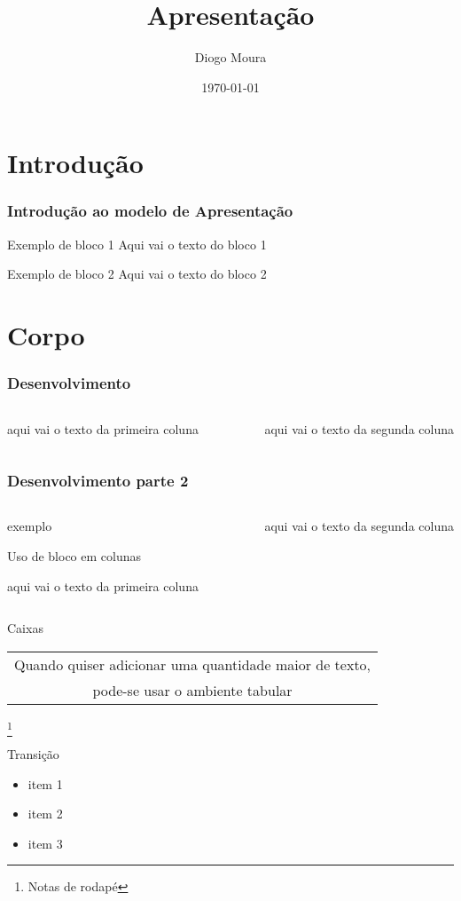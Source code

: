 \documentclass{beamer}
\title{Apresentação}
\author{Diogo Moura}
\date{\today}
\begin{document}
\frame{\titlepage}

\section{Introdução}
\begin{frame}
  \frametitle{Introdução ao modelo de Apresentação}
  \begin{block}{Exemplo de bloco 1}
    Aqui vai o texto do bloco 1
\end{block}

\begin{block}{Exemplo de bloco 2}
  Aqui vai o texto do bloco 2
\end{block}
\end{frame}

\section{Corpo}
\begin{frame}
  \frametitle{Desenvolvimento}
  \begin{columns}[t]
    \begin{column}{5cm}
      aqui vai o texto da primeira coluna
      
    \end{column}

    aqui vai o texto da segunda coluna
    
  \end{columns}
  

\end{frame}

\begin{frame}
  \frametitle{Desenvolvimento parte 2}
  \begin{columns}[t]
    \begin{column}{5cm}
      \begin{block}{exemplo}

        Uso de bloco em colunas
        
      \end{block}
      aqui vai o texto da primeira coluna
      
    \end{column}

    aqui vai o texto da segunda coluna
    
  \end{columns}
\end{frame}

\begin{frame}{Caixas}
  \begin{center}
    \begin{tabular}{|c|}
      \hline 
      Quando quiser adicionar uma quantidade maior de texto,\\ pode-se usar o ambiente tabular\\
      \hline
    \end{tabular}
  \end{center}
  \footnote{Notas de rodapé}
\end{frame}

\begin{frame}{Transição}
  \transdissolve
  \begin{itemize}
    \item item 1 \pause
    \item item 2 \pause
    \item item 3 
    
  \end{itemize}
\end{frame}
\end{document}
